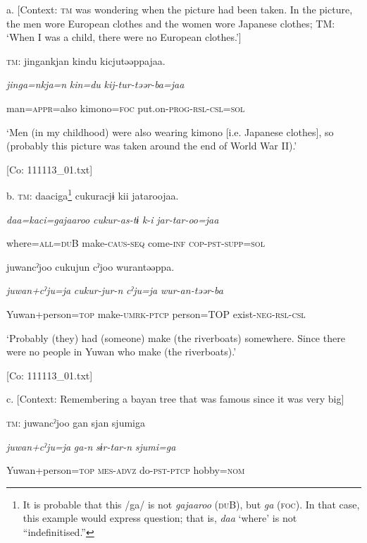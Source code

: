   a.  [Context: \textsc{tm} was wondering when the picture had been taken. In the picture, the men wore European clothes and the women wore Japanese clothes; TM: ‘When I was a child, there were no European clothes.’]

    \textsc{tm}:  jingankjan  kindu  kicjutəəppajaa.

      \textit{jinga=nkja=n}  \textit{kin=du}  \textit{kij-tur-təər-ba=jaa}

      man=\textsc{appr}=also  kimono=\textsc{foc}  put.on-\textsc{prog}-\textsc{rsl}-\textsc{csl}=\textsc{sol}

      ‘Men (in my childhood) were also wearing kimono [i.e. Japanese clothes], so (probably this picture was taken around the end of World War II).’

      [Co: 111113\_01.txt]

  b.  \textsc{tm}:  daaciga\footnote{It is probable that this /ga/ is not \textit{gajaaroo} (\textsc{du}B), but \textit{ga} (\textsc{foc}). In that case, this example would express question; that is, \textit{daa} ‘where’ is not “indefinitised.”}  cukuracjɨ  kii  jataroojaa.

      \textit{daa=kaci=gajaaroo}  \textit{cukur-as-tɨ}  \textit{k-i}  \textit{jar-tar-oo=jaa}

      where=\textsc{all}=\textsc{du}B  make-\textsc{caus}-\textsc{seq}  come-\textsc{inf}  \textsc{cop}-\textsc{pst}-\textsc{supp}=\textsc{sol}

      juwancˀjoo  cukujun  cˀjoo  wurantəəppa.

      \textit{juwan+cˀju=ja}  \textit{cukur-jur-n}  \textit{cˀju=ja}  \textit{wur-an-təər-ba}

      Yuwan+person=\textsc{top}  make-\textsc{umrk}-\textsc{ptcp}  person=TOP  exist-\textsc{neg}-\textsc{rsl}-\textsc{csl}

      ‘Probably (they) had (someone) make (the riverboats) somewhere. Since there were no people in Yuwan who make (the riverboats).’

      [Co: 111113\_01.txt]

  c.  [Context: Remembering a bayan tree that was famous since it was very big]

    \textsc{tm}:  juwancˀjoo  gan  sjan  {\textbar}sjumi{\textbar}ga

      \textit{juwan+cˀju=ja}  \textit{ga-n}  \textit{sɨr-tar-n}  \textit{sjumi=ga}

      Yuwan+person=\textsc{top}  \textsc{mes}-\textsc{advz}  do-\textsc{pst}-\textsc{ptcp}  hobby=\textsc{nom}

